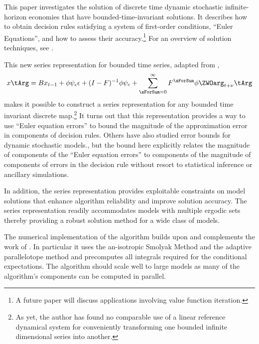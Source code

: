 \documentclass[12pt]{article}
\begin{document}
This paper investigates the solution of discrete time  dynamic stochastic
infinite-horizon economies that have bounded-time-invariant solutions.
It describes how to obtain decision rules satisfying a system of 
first-order conditions, ``Euler Equations'',  and how to assess their accuracy.\citep{juddGSSA2011,maliarmovingbounds}\footnote{A future paper will 
discuss  applications involving value function iteration.}
 For an overview of solution techniques,
see \cite{judd92,Christiano2000,doraszelskiy04,gaspar97,Judd2014,marcet.lorenzoni99}.


This new series representation for bounded time series, adapted from \citep{anderson10},
\begin{gather*}
      	 x\tArg =B x_{t-1}+ \phi \psi_\epsilon\epsilon + (I - F)^{-1} \phi \psi_c + \sum_{\sForSum=0}^\infty F^\sForSum \phi \ZWOarg_{t+\nu}\tArg%
    \end{gather*}
 makes it possible to  construct a series
    representation for any bounded time invariant discrete map.\footnote{As yet, the author has found no comparable use of a
linear reference dynamical system for  conveniently transforming
one bounded infinite dimensional series into another.
}
    It turns out that this representation provides a way to use
    ``Euler equation errors'' to
    bound the magnitude of the    approximation error in components of 
    decision rules.
    Others have also studied error bounds for dynamic stochastic models.\cite{judd2017lower,santos2005accuracy,Santos2000accuracy}, but the bound here
    explicitly relates the magnitude of components of the
    ``Euler equation errors'' to components of the magnitude of components of
    errors in the decision rule without resort to statistical inference or ancillary simulations.

    In addition, the series representation provides exploitable
    constraints on model solutions that enhance  
    algorithm reliability and improve solution accuracy.
    The series representation readily accommodates models with
    multiple ergodic sets
    thereby providing a robust solution method for a wide class of models.


The numerical implementation of the algorithm 
builds upon and complements the work of
\citep{juddGSSA2011}.
In particular it uses
the an-isotropic Smolyak Method and the adaptive
parallelotope method\citep{Judd2014}
and precomputes all integrals required for the conditional expectations.
The algorithm should scale well to large models as many 
of the algorithm's components can be computed in parallel.
\end{document}
